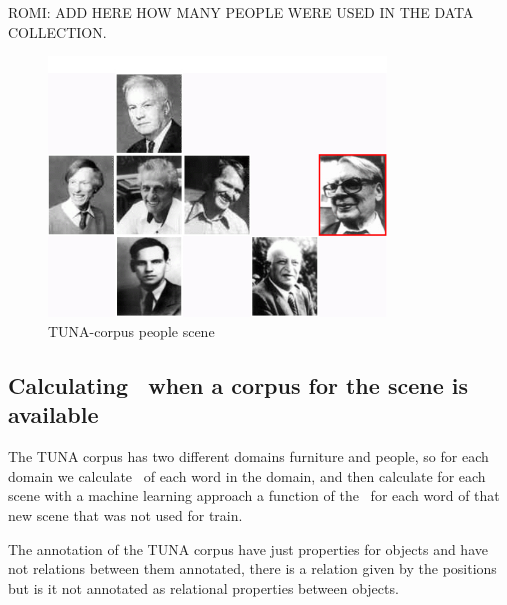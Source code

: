 ROMI: ADD HERE HOW MANY PEOPLE WERE USED IN THE DATA COLLECTION. 

\begin{figure}[ht]
\centering
\includegraphics[width=0.8\textwidth]{images/tuna-people.jpg}

\caption{TUNA-corpus people scene}
\label{Tuna-people-scene}
\centering

\end{figure}
\subsection{Calculating \puse\ when a corpus for the scene is available}

The TUNA corpus has two different domains furniture and people, so for each domain we calculate \puse\ of each word in the domain, and then calculate for each scene with a machine learning approach a function of the \puse\ for each word of that new scene that was not used for train. 

The annotation of the TUNA corpus have just properties for objects and have not relations between them annotated, there is a relation given by the positions but is it not annotated as relational properties between objects.

